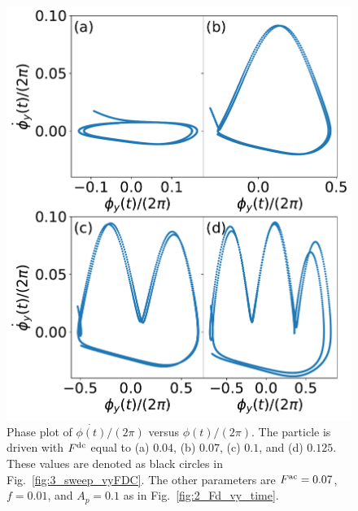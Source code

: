 \documentclass[preprint,showpacs,preprintnumbers,amsmath,amssymb,aps,prb]{revtex4-1}
\theoremstyle{remark}
\begin{document}
    \begin{figure}[h!]
      \centering
      \includegraphics[width=\columnwidth]{fig4_phase.pdf}
      \caption{
        Phase plot of $\dot{\phi(t)}/(2\pi)$ versus $\phi(t)/(2\pi)$.
        The particle is driven with $F^{\rm dc}$ equal to  (a) $0.04$, (b) $0.07$, (c) $0.1$, and (d) $0.125$.  These values are denoted as black circles
        in Fig.~\ref{fig:3_sweep_vyFDC}. 
      The other parameters
      are $F^{\rm ac} = 0.07$, $f=0.01$, and $A_p = 0.1$
      as in Fig.~\ref{fig:2_Fd_vy_time}.}
      \label{fig:4_phase}
    \end{figure}
\end{document}

